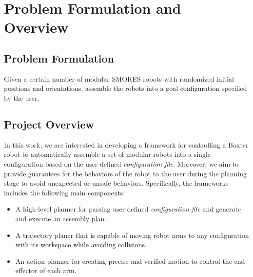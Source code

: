 \section{Problem Formulation and Overview}\label{pf}

\subsection{Problem Formulation}

Given a certain number of modular SMORES robots with randomized initial positions and orientations, assemble the robots into a goal configuration specified by the user.

\subsection{Project Overview}\label{overview}
In this work, we are interested in developing a framework for controlling a Baxter robot to automatically assemble a set of modular robots into a single configuration based on the user defined {\it configuration file}.
Moreover, we aim to provide guarantees for the behaviors of the robot to the user during the planning stage to avoid unexpected or unsafe behaviors.
Specifically, the frameworks includes the following main components:
\begin{itemize}
\item A high-level planner for parsing user defined {\it configuration file} and generate and execute an assembly plan. 
\item A trajectory planer that is capable of moving robot arms to any configuration with its workspace while avoiding collisions.
\item An action planner for creating precise and verified motion to control the end effector of each arm.
\end{itemize}